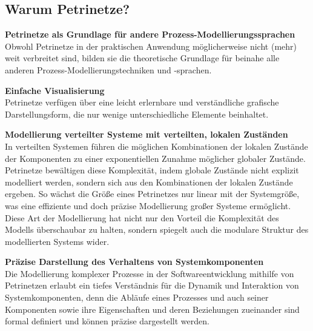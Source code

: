 \pagebreak %


\vspace{-1ex} %

\subsection*{Warum Petrinetze?}

\textbf{Petrinetze als Grundlage für andere Prozess-Modellierungssprachen}\\
Obwohl Petrinetze in der praktischen Anwendung möglicherweise nicht (mehr) weit verbreitet sind, bilden sie die theoretische Grundlage für beinahe alle anderen Pro\-zess-Model\-lie\-rungs\-tech\-niken und -sprachen.

\textbf{Einfache Visualisierung}\\
Petrinetze verfügen über eine leicht erlernbare und verständliche grafische Darstellungsform, die nur wenige unterschiedliche Elemente beinhaltet.

\textbf{Modellierung verteilter Systeme mit verteilten, lokalen Zuständen}\\
In verteilten Systemen führen die möglichen Kombinationen der lokalen Zustände der Komponenten zu einer exponentiellen Zunahme möglicher globaler Zustände. Petrinetze bewältigen diese Komplexität, indem globale Zustände nicht explizit modelliert werden, sondern sich aus den Kombinationen der lokalen Zustände ergeben. So wächst die Größe eines Petrinetzes nur linear mit der Systemgröße, was eine effi\-zi\-ente und doch präzise Modellierung großer Systeme ermöglicht. Diese Art der Modellierung hat nicht nur den Vorteil die Komplexität des Modells überschaubar zu halten, sondern spiegelt auch die modulare Struktur des modellierten Systems wider.

\textbf{Präzise Darstellung des Verhaltens von Systemkomponenten}\\
Die Modellierung komplexer Prozesse in der Softwareentwicklung mithilfe von Petrinetzen erlaubt ein tiefes Verständnis für die Dynamik und Interaktion von Systemkomponenten, denn die Abläufe eines Prozesses und auch seiner Komponenten sowie ihre Eigenschaften und deren Beziehungen zueinander sind formal definiert und können präzise dargestellt werden.

